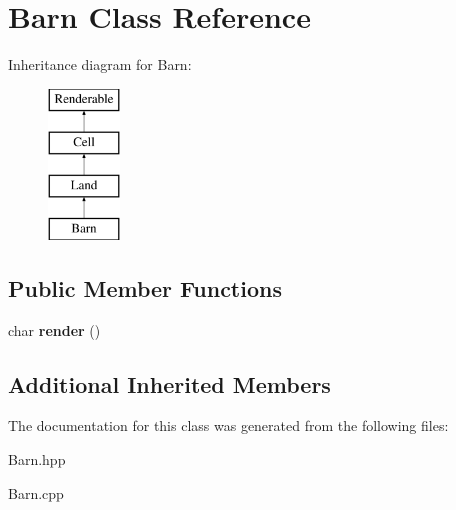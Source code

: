 \hypertarget{class_barn}{}\section{Barn Class Reference}
\label{class_barn}
Inheritance diagram for Barn\+:\begin{figure}[H]
\begin{center}
\leavevmode
\includegraphics[height=4.000000cm]{class_barn}
\end{center}
\end{figure}
\subsection*{Public Member Functions}
\begin{DoxyCompactItemize}
\item 
\mbox{\label{class_barn_a01118cf6372344557544a94ac0185d44}} 
char {\bfseries render} ()
\end{DoxyCompactItemize}
\subsection*{Additional Inherited Members}


The documentation for this class was generated from the following files\+:\begin{DoxyCompactItemize}
\item 
Barn.\+hpp\item 
Barn.\+cpp\end{DoxyCompactItemize}
